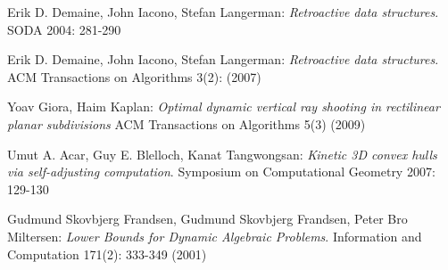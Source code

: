 \documentclass[11pt]{article}
\begin{document}
\begin{thebibliography}{77}

Erik D. Demaine, John Iacono, Stefan Langerman: \emph{Retroactive data structures}. SODA 2004: 281-290

Erik D. Demaine, John Iacono, Stefan Langerman: \emph{Retroactive data structures}. ACM Transactions on Algorithms 3(2): (2007)

Yoav Giora, Haim Kaplan: \emph{Optimal dynamic vertical ray shooting in rectilinear planar subdivisions} ACM Transactions on Algorithms 5(3) (2009)

 Umut A. Acar, Guy E. Blelloch, Kanat Tangwongsan: \emph{Kinetic 3D convex hulls via self-adjusting computation}. Symposium on Computational Geometry 2007: 129-130

Gudmund Skovbjerg Frandsen, Gudmund Skovbjerg Frandsen, Peter Bro Miltersen: \emph{Lower Bounds for Dynamic Algebraic Problems}. Information and Computation 171(2): 333-349 (2001)

\end{thebibliography}
\end{document}

